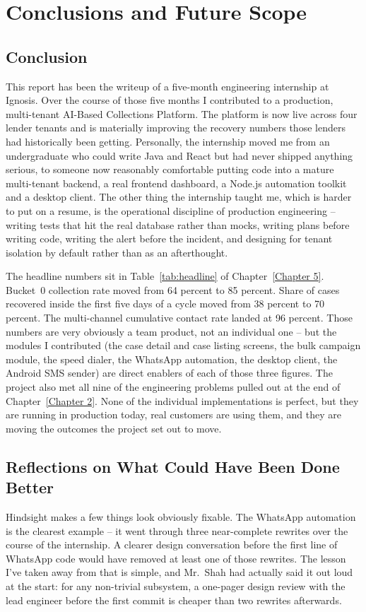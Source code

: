 \chapter{Conclusions and Future Scope}
\label{Chapter 6}

\section{Conclusion}
This report has been the writeup of a five-month engineering internship at Ignosis. Over the course of those five months I contributed to a production, multi-tenant AI-Based Collections Platform. The platform is now live across four lender tenants and is materially improving the recovery numbers those lenders had historically been getting. Personally, the internship moved me from an undergraduate who could write Java and React but had never shipped anything serious, to someone now reasonably comfortable putting code into a mature multi-tenant backend, a real frontend dashboard, a Node.js automation toolkit and a desktop client. The other thing the internship taught me, which is harder to put on a resume, is the operational discipline of production engineering -- writing tests that hit the real database rather than mocks, writing plans before writing code, writing the alert before the incident, and designing for tenant isolation by default rather than as an afterthought.

The headline numbers sit in Table~\ref{tab:headline} of Chapter~\ref{Chapter 5}. Bucket~0 collection rate moved from 64 percent to 85 percent. Share of cases recovered inside the first five days of a cycle moved from 38 percent to 70 percent. The multi-channel cumulative contact rate landed at 96 percent. Those numbers are very obviously a team product, not an individual one -- but the modules I contributed (the case detail and case listing screens, the bulk campaign module, the speed dialer, the WhatsApp automation, the desktop client, the Android SMS sender) are direct enablers of each of those three figures. The project also met all nine of the engineering problems pulled out at the end of Chapter~\ref{Chapter 2}. None of the individual implementations is perfect, but they are running in production today, real customers are using them, and they are moving the outcomes the project set out to move.

\section{Reflections on What Could Have Been Done Better}
Hindsight makes a few things look obviously fixable. The WhatsApp automation is the clearest example -- it went through three near-complete rewrites over the course of the internship. A clearer design conversation before the first line of WhatsApp code would have removed at least one of those rewrites. The lesson I've taken away from that is simple, and Mr.~Shah had actually said it out loud at the start: for any non-trivial subsystem, a one-pager design review with the lead engineer before the first commit is cheaper than two rewrites afterwards.

